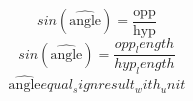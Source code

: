 \[sin(\widehat{{\text{{{angle}}}}})=\frac{{\text{{{opp}}}}}{{\text{{{hyp}}}}}\]
\[sin(\widehat{{\text{{{angle}}}}})=\frac{{{opp_length}}}{{{hyp_length}}}\]
\[\widehat{{\text{{{angle}}}}}{equal_sign}{result_with_unit}\]
